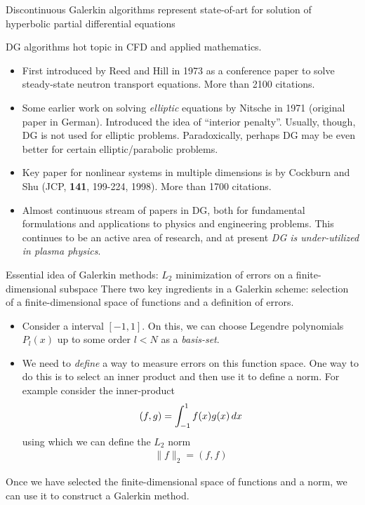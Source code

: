 \documentclass[pdf]{beamer}
\newcommand{\mypause}{}
\theoremstyle{definition}
\begin{document}
\begin{frame}{Discontinuous Galerkin algorithms represent state-of-art
    for solution of hyperbolic partial differential equations}

  DG algorithms hot topic in CFD and applied mathematics.
  \begin{itemize}
    \small
  \item First introduced by Reed and Hill in 1973 as a conference
    paper to solve steady-state neutron transport equations. More than
    2100 citations. \mypause
  \item Some earlier work on solving \emph{elliptic} equations by
    Nitsche in 1971 (original paper in German). Introduced the idea of
    ``interior penalty''. Usually, though, DG is not used for elliptic
    problems. Paradoxically, perhaps DG may be even better for certain
    elliptic/parabolic problems. \mypause
  \item Key paper for nonlinear systems in multiple dimensions is by
    Cockburn and Shu (JCP, {\bf 141}, 199-224, 1998). More than 1700
    citations. \mypause
  \item Almost continuous stream of papers in DG, both for fundamental
    formulations and applications to physics and engineering
    problems. This continues to be an active area of research, and at
    present \emph{DG is under-utilized in plasma physics}.
  \end{itemize}

\end{frame}

\begin{frame}{Essential idea of Galerkin methods: $L_2$ minimization
    of errors on a finite-dimensional subspace}
  \small%
  There two key ingredients in a Galerkin scheme: selection of a
  finite-dimensional space of functions and a definition of errors.
  \mypause%

  \begin{itemize}\small
  \item Consider a interval $[-1,1]$. On this, we can choose Legendre
    polynomials $P_l(x)$ up to some order $l<N$ as a \emph{basis-set}.
  \item We need to \emph{define} a way to measure errors on this
    function space. One way to do this is to select an inner product
    and then use it to define a norm. For example consider the
    inner-product
    \begin{align*}
      (f,g) = \int_{-1}^1 f(x) g(x) \thinspace dx
    \end{align*}
    using which we can define the $L_2$ norm
    \begin{align*}
      \| f \|_2 = (f, f)
    \end{align*}
  \end{itemize}
  Once we have selected the finite-dimensional space of functions and
  a norm, we can use it to construct a Galerkin method.
  
\end{frame}
\end{document}

